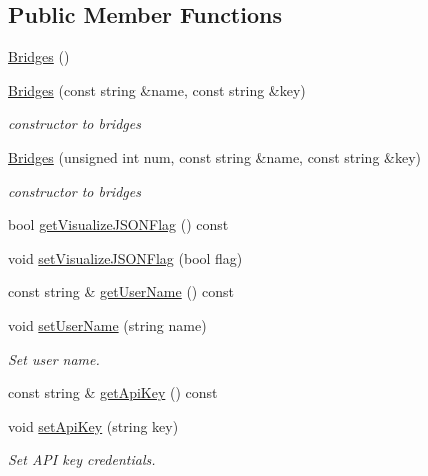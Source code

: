 \subsection*{Public Member Functions}
\begin{DoxyCompactItemize}
\item 
\mbox{\hyperlink{classbridges_1_1_bridges_aab8b250b2b5ba0034ceb2494fe5ea437}{Bridges}} ()
\item 
\mbox{\hyperlink{classbridges_1_1_bridges_a21d9e98cb1f3994300079b489f14e71e}{Bridges}} (const string \&name, const string \&key)
\begin{DoxyCompactList}\small\item\em constructor to bridges \end{DoxyCompactList}\item 
\mbox{\hyperlink{classbridges_1_1_bridges_aa58a928530695a5d0e9bf15fa09c8d84}{Bridges}} (unsigned int num, const string \&name, const string \&key)
\begin{DoxyCompactList}\small\item\em constructor to bridges \end{DoxyCompactList}\item 
bool \mbox{\hyperlink{classbridges_1_1_bridges_a6c2897b19a25989e09c031152a74317d}{get\+Visualize\+J\+S\+O\+N\+Flag}} () const
\item 
void \mbox{\hyperlink{classbridges_1_1_bridges_a69aca37ab2729d0345e0549d7baf0423}{set\+Visualize\+J\+S\+O\+N\+Flag}} (bool flag)
\item 
const string \& \mbox{\hyperlink{classbridges_1_1_bridges_ad16be2d94936fd555bc05f58c8c21f50}{get\+User\+Name}} () const
\item 
void \mbox{\hyperlink{classbridges_1_1_bridges_a383c5c1d3c85541f466e0cb60dde1c29}{set\+User\+Name}} (string name)
\begin{DoxyCompactList}\small\item\em Set user name. \end{DoxyCompactList}\item 
const string \& \mbox{\hyperlink{classbridges_1_1_bridges_a9a44f38d883859ef19c94ce17eec43b5}{get\+Api\+Key}} () const
\item 
void \mbox{\hyperlink{classbridges_1_1_bridges_a589e77031841f06a2f32d5b29e25d4af}{set\+Api\+Key}} (string key)
\begin{DoxyCompactList}\small\item\em Set A\+PI key credentials. \end{DoxyCompactList}\item 

\end{DoxyCompactItemize}

